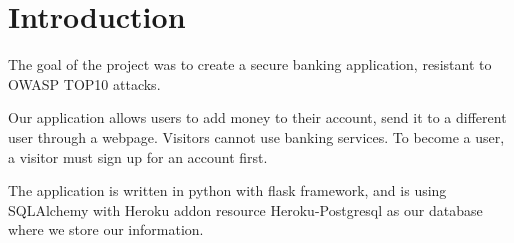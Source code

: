 \chapter*{Introduction}\label{kap:introduction}


The goal of the project was to create a secure banking application, resistant to OWASP TOP10 attacks.

Our application allows users to add money to their account,  send it to a different user through a webpage. Visitors cannot use banking services. To become a user, a visitor must sign up for an account first.

The application is written in python with flask framework, and is using SQLAlchemy with Heroku addon resource Heroku-Postgresql as our database where we store our information. 